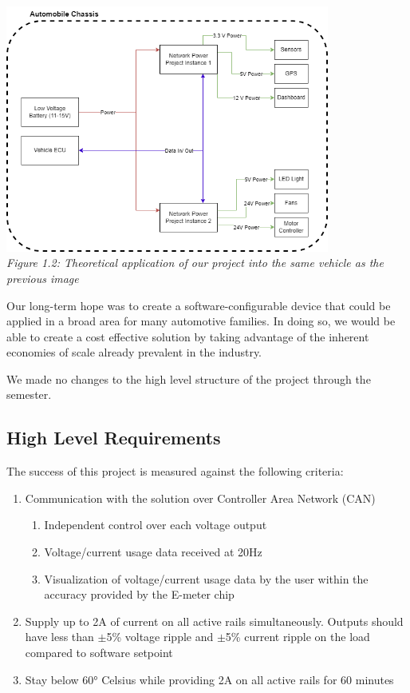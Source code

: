 \begin{center}
    \includegraphics[width=0.8\textwidth]{./images/new_status_diagram.png}\\
    \textit{Figure 1.2: Theoretical application of our project into the same vehicle as the previous image}\\
\end{center}
\vspace{\baselineskip}

Our long-term hope was to create a software-configurable device that could be applied in a broad area for many automotive families. 
In doing so, we would be able to create a cost effective solution by taking advantage of the inherent economies of scale already prevalent in the industry.

We made no changes to the high level structure of the project through the semester.

\subsection{High Level Requirements}
The success of this project is measured against the following criteria:
\begin{enumerate}
    \item Communication with the solution over Controller Area Network (CAN)
    \begin{enumerate}
        \item Independent control over each voltage output
        \item Voltage/current usage data received at 20Hz
        \item Visualization of voltage/current usage data by the user within the accuracy provided by the E-meter chip
    \end{enumerate}
    \item Supply up to 2A of current on all active rails simultaneously. Outputs should have less than $\pm$5\% voltage ripple and $\pm$5\% current ripple on the load compared to software setpoint
    \item Stay below 60° Celsius while providing 2A on all active rails for 60 minutes
\end{enumerate}
